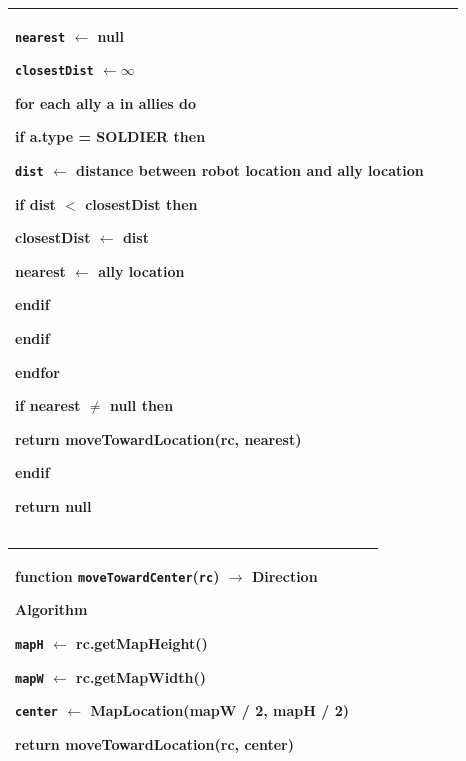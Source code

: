 \documentclass{article}
\newenvironment{pseudobox}
{
\centering
\begin{longtable}{|p{0.94\linewidth}|}
\hline
}
{
\\ \hline
\end{longtable}
\vspace{0.05cm}
}
\begin{document}
\begin{enumerate}[label=\alph*.]
\begin{pseudobox}
\hspace*{1.5em}\texttt{nearest} $\leftarrow$ null

\hspace*{1.5em}\texttt{closestDist} $\leftarrow \infty$

\hspace*{1.5em}for each ally a in allies do

\hspace*{3em}if a.type = SOLDIER then

\hspace*{4.5em}\texttt{dist} $\leftarrow$ distance between robot location and ally location

\hspace*{4.5em}if dist $<$ closestDist then

\hspace*{6em}closestDist $\leftarrow$ dist

\hspace*{6em}nearest $\leftarrow$ ally location

\hspace*{4.5em}endif

\hspace*{3em}endif

\hspace*{1.5em}endfor

\hspace*{1.5em}if nearest $\neq$ null then

\hspace*{3em}return moveTowardLocation(rc, nearest)

\hspace*{1.5em}endif

\hspace*{1.5em}return null
\end{pseudobox}

\begin{pseudobox}
\textbf{function \texttt{moveTowardCenter}(\texttt{rc}) $\rightarrow$ Direction}

\textbf{Algorithm}

\hspace*{1.5em}\texttt{mapH} $\leftarrow$ rc.getMapHeight()

\hspace*{1.5em}\texttt{mapW} $\leftarrow$ rc.getMapWidth()

\hspace*{1.5em}\texttt{center} $\leftarrow$ MapLocation(mapW / 2, mapH / 2)

\hspace*{1.5em}return moveTowardLocation(rc, center)
\end{pseudobox}


\end{enumerate}
\end{document}

